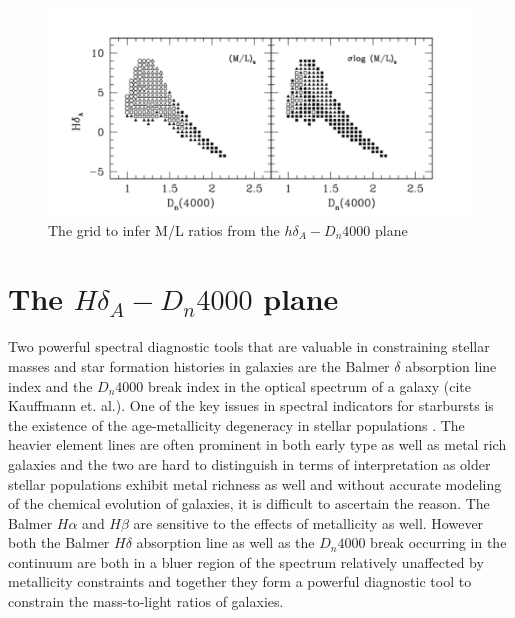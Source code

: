 \begin{figure}
\includegraphics[width=\textwidth]{figures/Kauffmann_grid}
\caption[Short figure name.]{The \citet{kauffmann_stellar_2003} grid to infer M/L ratios from the $h\delta_{A}-D_{n}4000$ plane
\label{fig:myInlineFigure}}
\end{figure}

\section{The $H\delta_{A}-D_{n}4000$ plane}

Two powerful spectral diagnostic tools that are valuable in constraining stellar masses and star formation histories in galaxies are the Balmer $\delta$ absorption line index and the $D_{n}4000$ break index in the optical spectrum of a galaxy (cite Kauffmann et. al.). One of the key issues in spectral indicators for starbursts is the existence of the age-metallicity degeneracy in stellar populations \citep{worthey_comprehensive_1994}. The heavier element lines are often prominent in both early type as well as metal rich galaxies and the two are hard to distinguish in terms of interpretation as older stellar populations exhibit metal richness as well and without accurate modeling of the chemical evolution of galaxies, it is difficult to ascertain the reason. The Balmer $H\alpha$ and $H\beta$ are sensitive to the effects of metallicity as well. However both the Balmer $H\delta$ absorption line as well as the $D_{n}4000$ break occurring in the continuum are both in a bluer region of the spectrum relatively unaffected by metallicity constraints and together they form a powerful diagnostic tool to constrain the mass-to-light ratios of galaxies. 

